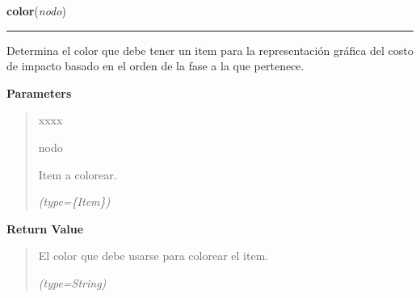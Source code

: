     \label{saip:lib:func:color}

    \vspace{0.5ex}

\hspace{.8\funcindent}\begin{boxedminipage}{\funcwidth}

    \raggedright \textbf{color}(\textit{nodo})

    \vspace{-1.5ex}

    \rule{\textwidth}{0.5\fboxrule}
\setlength{\parskip}{2ex}
    Determina el color que debe tener un item para la representación 
    gráfica del costo de impacto basado en el orden de la fase a la que 
    pertenece.

\setlength{\parskip}{1ex}
      \textbf{Parameters}
      \vspace{-1ex}

      \begin{quote}
        \begin{Ventry}{xxxx}

          \item[nodo]

          Item a colorear.

            {\it (type=\{Item\})}

        \end{Ventry}

      \end{quote}

      \textbf{Return Value}
    \vspace{-1ex}

      \begin{quote}
      El color que debe usarse para colorear el item.

      {\it (type=String)}

      \end{quote}

    \end{boxedminipage}

    \label{saip:lib:func:costo_impacto}

    \vspace{0.5ex}

